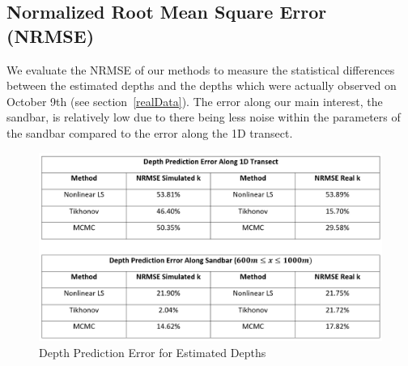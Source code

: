 \subsection{Normalized Root Mean Square Error (NRMSE)}
We evaluate the NRMSE of our methods to measure the statistical differences between the estimated depths and the depths which were actually observed on October 9th (see section~\ref{realData}). The error along our main interest, the sandbar, is relatively low due to there being less noise within the parameters of the sandbar compared to the error along the 1D transect.
\begin{figure}[H]
		\centering
		\includegraphics[width=0.80\linewidth]{img/NRMSE_Chart.png}
		\caption{Depth Prediction Error for Estimated Depths}
\end{figure}
		